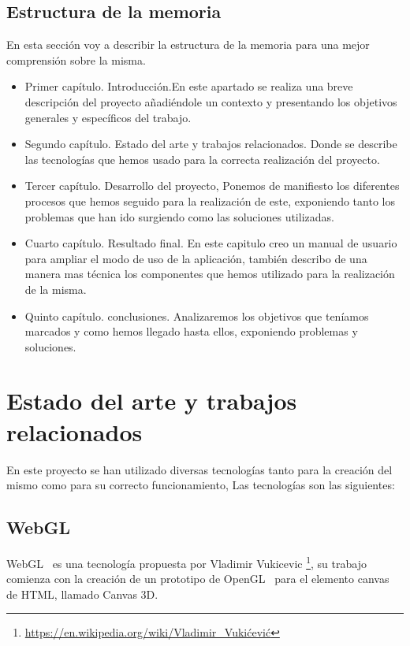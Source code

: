 \documentclass[a4paper, 12pt]{book}
\begin{document}
\section{Estructura de la memoria}
\label{sec:estructura}
En esta sección voy a describir la estructura de la memoria para una mejor 
comprensión sobre la misma.
\begin{itemize}
\item Primer capítulo. Introducción.En este apartado se realiza una breve descripción del proyecto añadiéndole un contexto y presentando los objetivos generales y específicos del trabajo.
\item Segundo capítulo. Estado del arte y trabajos relacionados. Donde se describe las tecnologías que hemos usado para la correcta realización del proyecto.
\item Tercer capítulo. Desarrollo del proyecto, Ponemos de manifiesto los diferentes procesos que hemos seguido para la realización de este, exponiendo tanto los problemas que han ido surgiendo como las soluciones utilizadas.
\item Cuarto capítulo. Resultado final. En este capitulo creo un manual de usuario para ampliar el modo de uso de la aplicación, también describo de una manera mas técnica los componentes que hemos utilizado para la realización de la misma.
\item Quinto capítulo. conclusiones. Analizaremos los objetivos que teníamos marcados y como hemos llegado hasta ellos, exponiendo problemas y soluciones.
\end{itemize}

\cleardoublepage %
\chapter{Estado del arte y trabajos relacionados} %
\label{chap:objetivos} %
En este proyecto se han utilizado diversas tecnologías tanto para la creación del mismo como para su correcto funcionamiento, Las tecnologías son las siguientes:

\section{WebGL} %
\label{sec:WebGl}
WebGL~\cite{webGl} es una tecnología propuesta por Vladimir Vukicevic \footnote{\url{https://en.wikipedia.org/wiki/Vladimir_Vukićević}}, su trabajo comienza con la creación de un prototipo de OpenGL~\cite{openGL} para el elemento canvas de HTML, llamado Canvas 3D.
\end{document}
